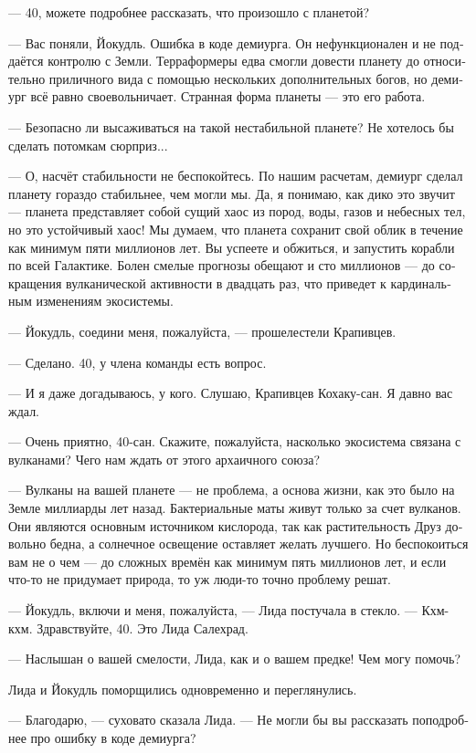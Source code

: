 \documentclass[a4paper,12pt,fleqn]{book}\usepackage{polyglossia}\setdefaultlanguage[babelshorthands=true]{russian}\setotherlanguage{english}\defaultfontfeatures{Ligatures=TeX,Mapping=tex-text}\usepackage{xcolor}\newcommand{\ml}[3]{#2}
\begin{document}
--- 40, можете подробнее рассказать, что произошло с планетой?

--- Вас поняли, Йокудль.
Ошибка в коде демиурга.
Он нефункционален и не поддаётся контролю с Земли.
Терраформеры едва смогли довести планету до относительно приличного вида с помощью нескольких дополнительных богов, но демиург всё равно своевольничает.
Странная форма планеты --- это его работа.

--- Безопасно ли высаживаться на такой нестабильной планете?
Не хотелось бы сделать потомкам сюрприз...

--- О, насчёт стабильности не беспокойтесь.
По нашим расчетам, демиург сделал планету гораздо стабильнее, чем могли мы.
Да, я понимаю, как дико это звучит --- планета представляет собой сущий хаос из пород, воды, газов и небесных тел, но это устойчивый хаос!
Мы думаем, что планета сохранит свой облик в течение как минимум пяти миллионов лет.
Вы успеете и обжиться, и запустить корабли по всей Галактике.
Болен смелые прогнозы обещают и сто миллионов --- до сокращения вулканической активности в двадцать раз, что приведет к кардинальным изменениям экосистемы.

--- Йокудль, соедини меня, пожалуйста, --- прошелестели Крапивцев.

--- Сделано.
40, у члена команды есть вопрос.

--- И я даже догадываюсь, у кого.
Слушаю, Крапивцев Кохаку-сан.
Я давно вас ждал.

--- Очень приятно, 40-сан.
Скажите, пожалуйста, насколько экосистема связана с вулканами?
Чего нам ждать от этого архаичного союза?

--- Вулканы на вашей планете --- не проблема, а основа жизни, как это было на Земле миллиарды лет назад.
Бактериальные маты живут только за счет вулканов.
Они являются основным источником кислорода, так как растительность Друз довольно бедна, а солнечное освещение оставляет желать лучшего.
Но беспокоиться вам не о чем --- до сложных времён как минимум пять миллионов лет, и если что-то не придумает природа, то уж люди-то точно проблему решат.

--- Йокудль, включи и меня, пожалуйста, --- Лида постучала в стекло.
--- Кхм-кхм.
Здравствуйте, 40.
Это Лида Салехрад.

--- Наслышан о вашей смелости, Лида, как и о вашем предке!
Чем могу помочь?

Лида и Йокудль поморщились одновременно и переглянулись.

--- Благодарю, --- суховато сказала Лида.
--- Не могли бы вы рассказать поподробнее про ошибку в коде демиурга?
\end{document}
